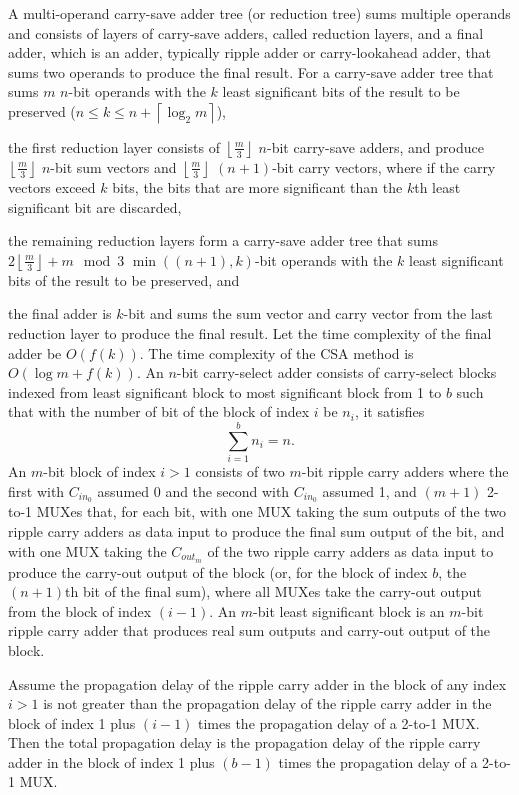 \documentclass[a4paper,12pt]{report}
\begin{document}
A multi-operand carry-save adder tree (or reduction tree) sums multiple operands and consists of layers of carry-save adders, called reduction layers, and a final adder, which is an adder, typically ripple adder or carry-lookahead adder, that sums two operands to produce the final result. For a carry-save adder tree that sums $m$ $n$-bit operands with the $k$ least significant bits of the result to be preserved ($n\leq k\leq n+\left\lceil\log_2m\right\rceil$),
\bit
\item the first reduction layer consists of $\left\lfloor\frac{m}{3}\right\rfloor$ $n$-bit carry-save adders, and produce $\left\lfloor\frac{m}{3}\right\rfloor$ $n$-bit sum vectors and $\left\lfloor\frac{m}{3}\right\rfloor$ $(n+1)$-bit carry vectors, where if the carry vectors exceed $k$ bits, the bits that are more significant than the $k$th least significant bit are discarded,
\item the remaining reduction layers form a carry-save adder tree that sums $2\left\lfloor\frac{m}{3}\right\rfloor+m\mod 3$ $\min((n+1),k)$-bit operands with the $k$ least significant bits of the result to be preserved, and
\item the final adder is $k$-bit and sums the sum vector and carry vector from the last reduction layer to produce the final result.
\eit
Let the time complexity of the final adder be $O(f(k))$. The time complexity of the CSA method is $O(\log m+f(k))$.
An $n$-bit carry-select adder consists of carry-select blocks indexed from least significant block to most significant block from 1 to $b$ such that with the number of bit of the block of index $i$ be $n_i$, it satisfies
\[\sum_{i=1}^bn_i=n.\]
An $m$-bit block of index $i>1$ consists of two $m$-bit ripple carry adders where the first with $C_{in_0}$ assumed 0 and the second with $C_{in_0}$ assumed 1, and $(m+1)$ 2-to-1 MUXes that, for each bit, with one MUX taking the sum outputs of the two ripple carry adders as data input to produce the final sum output of the bit, and with one MUX taking the $C_{out_m}$ of the two ripple carry adders as data input to produce the carry-out output of the block (or, for the block of index $b$, the $(n+1)$th bit of the final sum), where all MUXes take the carry-out output from the block of index $(i-1)$. An $m$-bit least significant block is an $m$-bit ripple carry adder that produces real sum outputs and carry-out output of the block.

Assume the propagation delay of the ripple carry adder in the block of any index $i>1$ is not greater than the propagation delay of the ripple carry adder in the block of index 1 plus $(i-1)$ times the propagation delay of a 2-to-1 MUX. Then the total propagation delay is the propagation delay of the ripple carry adder in the block of index 1 plus $(b-1)$ times the propagation delay of a 2-to-1 MUX.
\end{document}
